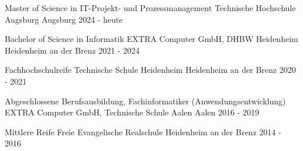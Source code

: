 
\begin{cventries}
  \cventry
  {Master of Science in IT-Projekt- und Prozessmanagement} %
  {Technische Hochschule Augsburg} %
  {Augsburg} %
  {2024 - heute} %
  {
  }

  \cventry
  {Bachelor of Science in Informatik} %
  {EXTRA Computer GmbH, DHBW Heidenheim} %
  {Heidenheim an der Brenz} %
  {2021 - 2024} %
  {
  }

  \cventry
  {Fachhochschulreife} %
  {Technische Schule Heidenheim} %
  {Heidenheim an der Brenz} %
  {2020 - 2021} %
  {
  }

  \cventry
  {Abgeschlossene Berufsausbildung, Fachinformatiker (Anwendungsentwicklung)} %
  {EXTRA Computer GmbH, Technische Schule Aalen} %
  {Aalen} %
  {2016 - 2019} %
  {
  }

  \cventry
  {Mittlere Reife} %
  {Freie Evangelische Realschule} %
  {Heidenheim an der Brenz} %
  {2014 - 2016} %
  {
  }
\end{cventries}
